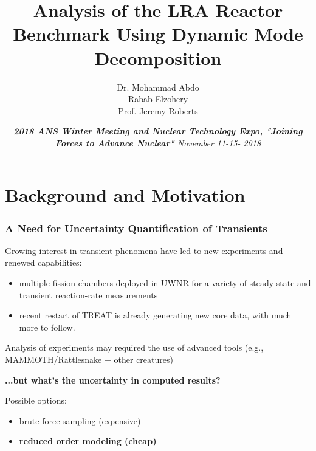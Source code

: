 \documentclass[fleqn]{beamer}
\title[]{
    Analysis of the LRA Reactor Benchmark Using Dynamic Mode Decomposition}
\author[]{
Dr. Mohammad Abdo \\
	       Rabab Elzohery \\
               Prof. Jeremy Roberts}
\institute[Kansas State University]{
    Mechanical and Nuclear Engineering \\
    Kansas State University}
\date[]{\emph{{\textbf{2018 ANS Winter Meeting and Nuclear Technology Expo, "Joining Forces to Advance Nuclear"}}
    November 11-15- 2018}}
\begin{document}
    \newcommand{\beginbackup}{
        \newcounter{framenumbervorappendix}
        \setcounter{framenumbervorappendix}{\value{framenumber}}
    }
    \newcommand{\backupend}{
        \addtocounter{framenumbervorappendix}{-\value{framenumber}}
        \addtocounter{framenumber}{\value{framenumbervorappendix}} 
    }
    
    \begin{frame}
        \titlepage
    \end{frame}
    

\section{Background and Motivation}
    
    
\begin{frame}
\frametitle{A Need for Uncertainty Quantification of Transients}       

\vfill

Growing interest in transient phenomena have led to new experiments and renewed capabilities:
\pause
\begin{itemize}
 \item multiple fission chambers deployed in UWNR for a variety of  steady-state and transient reaction-rate measurements
 \pause 
 \item recent restart of TREAT is already generating new core data, with much more to follow.
\end{itemize}

\vfill 
\pause 

Analysis of experiments may required the use of advanced tools (e.g., MAMMOTH/Rattlesnake + other creatures)

\pause 
\vfill

{\bf ...but what's the uncertainty in computed results?}
 
\pause 
\vfill

Possible options:
\begin{itemize}
 \item brute-force sampling (expensive)
 \item {\bf reduced order modeling (cheap)}
\end{itemize}
 
\vfill
 
\end{frame}
\end{document}
